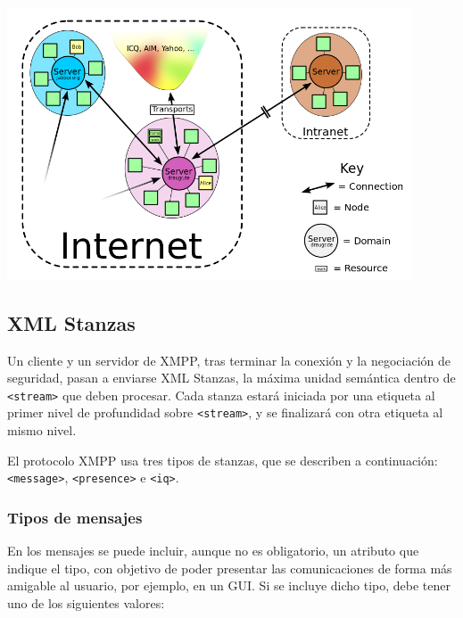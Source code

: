 \documentclass[a4paper, 11pt]{article} %
\begin{document}
      \begin{center}
      \includegraphics[width=12cm]{network.png}
      \end{center}
      
    
    
  \subsection{XML Stanzas}
    Un cliente y un servidor de XMPP, tras terminar la conexión y la negociación de seguridad,
    pasan a enviarse XML Stanzas, la máxima unidad semántica dentro de \texttt{<stream>} que deben procesar.
    Cada stanza estará iniciada por una etiqueta al primer nivel de profundidad sobre \texttt{<stream>},
    y se finalizará con otra etiqueta al mismo nivel.
    
    El protocolo XMPP usa tres tipos de stanzas, que se describen a continuación: \texttt{<message>}, \texttt{<presence>}
    e \texttt{<iq>}.
  
    \subsubsection{Tipos de mensajes}
      En los mensajes se puede incluir, aunque no es obligatorio, un atributo que indique el tipo, con objetivo de poder
      presentar las comunicaciones de forma más amigable al usuario, por ejemplo, en un GUI. Si se incluye dicho tipo, debe
      tener uno de los siguientes valores:
      
\end{document}
